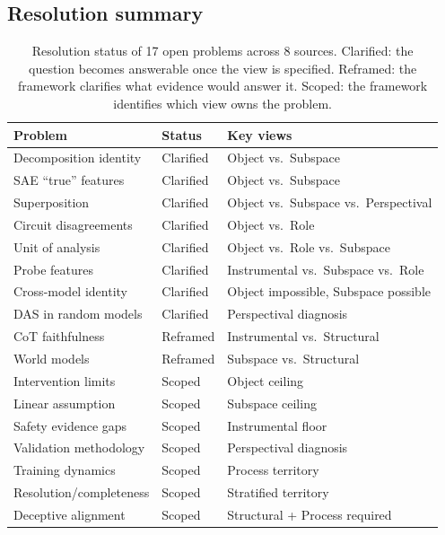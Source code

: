 \documentclass{article}
\begin{document}
\subsection{Resolution summary}

\begin{table}[H]
\centering
\footnotesize
\begin{tabular}{lll}
\toprule
\textbf{Problem} & \textbf{Status} & \textbf{Key views} \\
\midrule
Decomposition identity & Clarified & Object vs.\ Subspace \\
SAE ``true'' features & Clarified & Object vs.\ Subspace \\
Superposition & Clarified & Object vs.\ Subspace vs.\ Perspectival \\
Circuit disagreements & Clarified & Object vs.\ Role \\
Unit of analysis & Clarified & Object vs.\ Role vs.\ Subspace \\
Probe features & Clarified & Instrumental vs.\ Subspace vs.\ Role \\
Cross-model identity & Clarified & Object impossible, Subspace possible \\
DAS in random models & Clarified & Perspectival diagnosis \\
CoT faithfulness & Reframed & Instrumental vs.\ Structural \\
World models & Reframed & Subspace vs.\ Structural \\
Intervention limits & Scoped & Object ceiling \\
Linear assumption & Scoped & Subspace ceiling \\
Safety evidence gaps & Scoped & Instrumental floor \\
Validation methodology & Scoped & Perspectival diagnosis \\
Training dynamics & Scoped & Process territory \\
Resolution/completeness & Scoped & Stratified territory \\
Deceptive alignment & Scoped & Structural + Process required \\
\bottomrule
\end{tabular}
\caption{Resolution status of 17 open problems across 8 sources.
Clarified: the question becomes answerable once the view is specified. Reframed:
the framework clarifies what evidence would answer it. Scoped: the
framework identifies which view owns the problem.}
\label{tab:openprobs}
\end{table}
\end{document}
